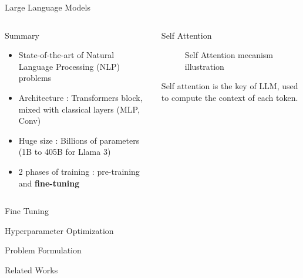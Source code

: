 \begin{frame}{Large Language Models}
   \begin{columns}
         
       \begin{column}[t]{0.4\textwidth}
       \begin{block}{Summary}
       
           \begin{itemize}
               \item State-of-the-art of Natural Language Processing (NLP) problems
               \item Architecture : Transformers\cite{NIPS2017_3f5ee243} block, mixed with classical layers (MLP, Conv)
               \item Huge size : Billions of parameters (1B to 405B for Llama 3)
               \item 2 phases of training : pre-training and \textbf{fine-tuning}
           \end{itemize}
               
   
       \end{block}
       \end{column}
           
       \begin{column}[t]{0.55\textwidth}
       \begin{block}{Self Attention }
   
           \begin{figure}
               \centering
               
               \caption{Self Attention mecanism illustration}
           \end{figure}
       
           Self attention is the key of LLM, used to compute the context of each token.
       \end{block}  
       \end{column}
            
   \end{columns}
   \end{frame}

\begin{frame}{Fine Tuning}
   
\end{frame}

\begin{frame}{Hyperparameter Optimization}
   
\end{frame}

\begin{frame}{Problem Formulation}
   
\end{frame}

\begin{frame}{Related Works}
   
\end{frame}